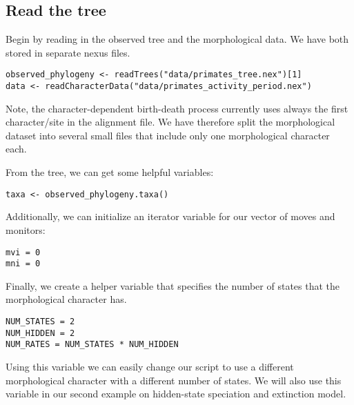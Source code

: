 \subsection{Read the tree}

Begin by reading in the observed tree and the morphological data. 
We have both stored in separate nexus files.
{\tt \begin{snugshade*}
\begin{lstlisting}
observed_phylogeny <- readTrees("data/primates_tree.nex")[1]
data <- readCharacterData("data/primates_activity_period.nex")
\end{lstlisting}
\end{snugshade*}}
Note, the character-dependent birth-death process currently uses always the first character/site in the alignment file.
We have therefore split the morphological dataset into several small files that include only one morphological character each.

From the tree, we can get some helpful variables:
{\tt \begin{snugshade*}
\begin{lstlisting}
taxa <- observed_phylogeny.taxa()
\end{lstlisting}
\end{snugshade*}}

Additionally, we can initialize an iterator variable for our vector of moves and monitors:
{\tt \begin{snugshade*}
\begin{lstlisting}
mvi = 0
mni = 0
\end{lstlisting}
\end{snugshade*}}

Finally, we create a helper variable that specifies the number of states that the morphological character has.
{\tt \begin{snugshade*}
\begin{lstlisting}
NUM_STATES = 2
NUM_HIDDEN = 2
NUM_RATES = NUM_STATES * NUM_HIDDEN
\end{lstlisting}
\end{snugshade*}}
Using this variable we can easily change our script to use a different morphological character with a different number of states.
We will also use this variable in our second example on hidden-state speciation and extinction model. 


